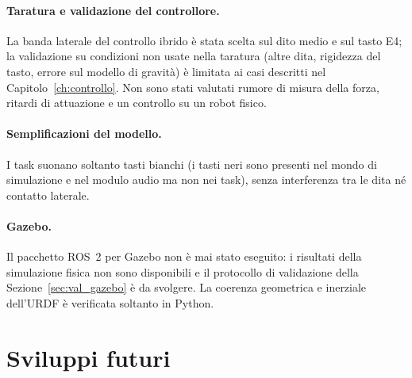 \paragraph{Taratura e validazione del controllore.} La banda laterale del controllo ibrido è stata scelta sul dito medio e sul tasto E4; la validazione su condizioni non usate nella taratura (altre dita, rigidezza del tasto, errore sul modello di gravità) è limitata ai casi descritti nel Capitolo~\ref{ch:controllo}. Non sono stati valutati rumore di misura della forza, ritardi di attuazione e un controllo su un robot fisico.

\paragraph{Semplificazioni del modello.} I task suonano soltanto tasti bianchi (i tasti neri sono presenti nel mondo di simulazione e nel modulo audio ma non nei task), senza interferenza tra le dita né contatto laterale.

\paragraph{Gazebo.} Il pacchetto ROS~2 per Gazebo non è mai stato eseguito: i risultati della simulazione fisica non sono disponibili e il protocollo di validazione della Sezione~\ref{sec:val_gazebo} è da svolgere. La coerenza geometrica e inerziale dell'URDF è verificata soltanto in Python.

\section{Sviluppi futuri}

